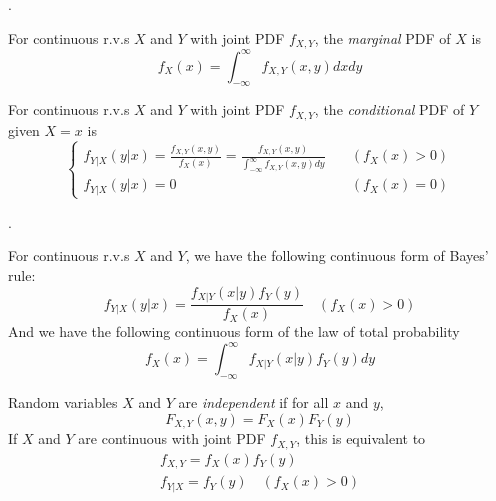 \documentclass[8pt]{beamer}
\newcommand{\ti}[1]{\textit{#1}}
\begin{document}
\begin{frame}{.}
    \begin{definition}
        For continuous r.v.s $X$ and $Y$ with joint PDF $f_{X,Y}$, the \ti{marginal} PDF of $X$ is 
        \[
            f_X(x) = \int_{-\infty}^\infty f_{X,Y} (x,y) dx dy
        \]
    \end{definition}

    \begin{definition}
        For continuous r.v.s $X$ and $Y$ with joint PDF $f_{X,Y}$, the \ti{conditional} PDF of $Y$ given $X=x$ is 
        \[
        \begin{cases}
            f_{Y|X}(y|x) = \frac{f_{X,Y}(x,y)}{f_X(x)}  = \frac{f_{X,Y}(x,y)}{\int_{-\infty}^\infty f_{X,Y}(x,y) dy} &\quad (f_X(x) > 0) \\ 
            f_{Y|X}(y|x) = 0 &\quad (f_X(x) = 0)
        \end{cases}
        \]
    \end{definition}
\end{frame}

\begin{frame}{.}
    \begin{theorem}
        For continuous r.v.s $X$ and $Y$, we have the following continuous form of Bayes' rule:
        \[
            f_{Y|X}(y|x) = \frac{f_{X|Y}(x|y)f_Y(y)}{f_X(x)} \quad (f_X(x)>0)
        \]
        And we have the following continuous form of the law of total probability
        \[
        f_X(x) = \int_{-\infty}^\infty f_{X|Y}(x|y) f_Y(y)dy
        \]
    \end{theorem}

    \begin{definition}
        Random variables $X$ and $Y$ are \ti{independent} if for all $x$ and $y$,
        \[
        F_{X,Y} (x,y) = F_X(x)F_Y(y)
        \]
        If $X$ and $Y$ are continuous with joint PDF $f_{X,Y}$, this is equivalent to
        \[
        \begin{gathered}
            f_{X,Y} = f_X(x)f_Y(y) \\
            f_{Y|X} = f_Y(y) \quad (f_X(x) > 0)
        \end{gathered}
        \]
    \end{definition}

    
\end{frame}
\end{document}
